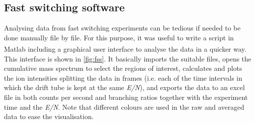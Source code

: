 
















\subsection{Fast switching software}\label{sec:fs_data}
Analysing data from fast switching experiments can be tedious if needed to be done  manually file by file.
%
For this purpose, %
it was useful to write a script in Matlab\textsuperscript{\textregistered}  including  a graphical user interface to analyse the data in a quicker way.
%
This interface is shown in \autoref{fig:fss}.
It basically imports the suitable files, opens the cumulative mass spectrum to select the regions of interest, calculates and plots the ion intensities splitting the data in frames (i.e. each of the time intervals in which the drift tube is kept at the same \textit{E/N}), and exports the data to an excel file in both counts per second and branching ratios together with the experiment time and the \textit{E/N}.
%
Note that different colours are used in the raw and averaged data to ease the visualisation.

